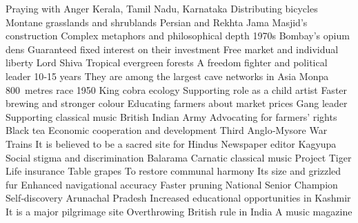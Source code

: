 \answerkey
{} Praying with Anger
 Kerala, Tamil Nadu, Karnataka
 Distributing bicycles
 Montane grasslands and shrublands
 Persian and Rekhta
 Jama Masjid's construction
 Complex metaphors and philosophical depth
 1970s Bombay's opium dens
 Guaranteed fixed interest on their investment
 Free market and individual liberty
 Lord Shiva
 Tropical evergreen forests
 A freedom fighter and political leader
 10‑15 years
 They are among the largest cave networks in Asia
 Monpa
 800 metres race
 1950
 King cobra ecology
 Supporting role as a child artist
 Faster brewing and stronger colour
 Educating farmers about market prices
 Gang leader
 Supporting classical music
 British Indian Army
 Advocating for farmers' rights
 Black tea
 Economic cooperation and development
 Third Anglo‑Mysore War
 Trains
 It is believed to be a sacred site for Hindus
 Newspaper editor
 Kagyupa
 Social stigma and discrimination
 Balarama
 Carnatic classical music
 Project Tiger
 Life insurance
 Table grapes
 To restore communal harmony
 Its size and grizzled fur
 Enhanced navigational accuracy
 Faster pruning
 National Senior Champion
 Self‑discovery
 Arunachal Pradesh
 Increased educational opportunities in Kashmir
 It is a major pilgrimage site
 Overthrowing British rule in India
 A music magazine
\endanswerkey